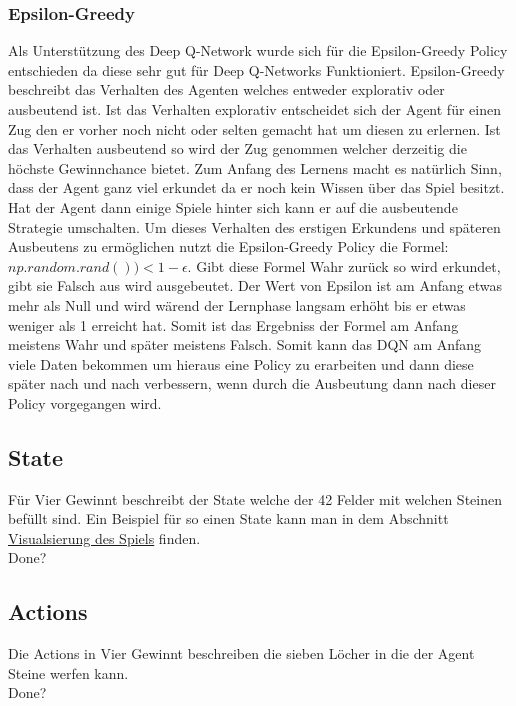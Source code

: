 \subsubsection{Epsilon-Greedy}
Als Unterstützung des Deep Q-Network wurde sich für die Epsilon-Greedy Policy entschieden da diese sehr gut für Deep Q-Networks Funktioniert. Epsilon-Greedy beschreibt das Verhalten des Agenten welches entweder explorativ oder ausbeutend ist. Ist das Verhalten explorativ entscheidet sich der Agent für einen Zug den er vorher noch nicht oder selten gemacht hat um diesen zu erlernen. Ist das Verhalten ausbeutend so wird der Zug genommen welcher derzeitig die höchste Gewinnchance bietet. Zum Anfang des Lernens macht es natürlich Sinn, dass der Agent ganz viel erkundet da er noch kein Wissen über das Spiel besitzt. Hat der Agent dann einige Spiele hinter sich kann er auf die ausbeutende Strategie umschalten. Um dieses Verhalten des erstigen Erkundens und späteren Ausbeutens zu ermöglichen nutzt die Epsilon-Greedy Policy die Formel: $np.random.rand())<1-\epsilon$. Gibt diese Formel Wahr zurück so wird erkundet, gibt sie Falsch aus wird ausgebeutet. Der Wert von Epsilon ist am Anfang etwas mehr als Null und wird wärend der Lernphase langsam erhöht bis er etwas weniger als 1 erreicht hat. Somit ist das Ergebniss der Formel am Anfang meistens Wahr und später meistens Falsch. Somit kann das DQN am Anfang viele Daten bekommen um hieraus eine Policy zu erarbeiten und dann diese später nach und nach verbessern, wenn durch die Ausbeutung dann nach dieser Policy vorgegangen wird.

\subsection{State}
 Für Vier Gewinnt beschreibt der State welche der 42 Felder mit welchen Steinen befüllt sind. Ein Beispiel für so einen State kann man in dem Abschnitt \hyperref[sec:visualisierung]{Visualsierung des Spiels} finden.\\
\colorbox{red!30}{Done?}

\subsection{Actions}
Die Actions in Vier Gewinnt beschreiben die sieben Löcher in die der Agent Steine werfen kann.\\
\colorbox{red!30}{Done?} 

